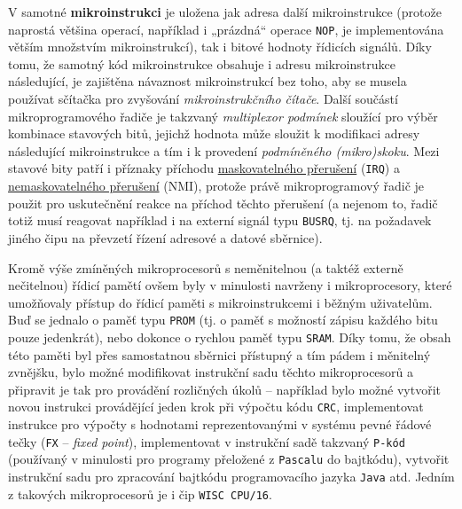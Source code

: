       V samotné \textbf{mikroinstrukci} je uložena jak adresa další mikroinstrukce (protože 
      naprostá většina operací, například i „prázdná“ operace \texttt{NOP}, je implementována 
      větším množstvím mikroinstrukcí), tak i bitové hodnoty řídicích signálů. Díky tomu, že 
      samotný kód mikroinstrukce obsahuje i adresu mikroinstrukce následující, je zajištěna 
      návaznost mikroinstrukcí bez toho, aby se musela používat sčítačka pro zvyšování 
      \emph{mikroinstrukčního čítače}. Další součástí mikroprogramového řadiče je takzvaný 
      \emph{multiplexor podmínek} sloužící pro výběr kombinace stavových bitů, jejichž hodnota může 
      sloužit k modifikaci adresy následující mikroinstrukce a tím i k provedení \emph{podmíněného 
      (mikro)skoku}. Mezi stavové bity patří i příznaky příchodu 
      \hyperlink{ces:IchapIVsecIV}{maskovatelného přerušení} (\texttt{IRQ}) a 
      \hyperlink{ces:IchapIVsecIV}{nemaskovatelného přerušení} (NMI), protože právě mikroprogramový 
      řadič je použit pro uskutečnění reakce na příchod těchto přerušení (a nejenom to, řadič totiž 
      musí reagovat například i na externí signál typu \texttt{BUSRQ}, tj. na požadavek jiného čipu 
      na převzetí řízení adresové a datové sběrnice). 
      
      \begin{note}
        Kromě výše zmíněných mikroprocesorů s neměnitelnou (a taktéž externě nečitelnou) řídicí 
        pamětí ovšem byly v minulosti navrženy i mikroprocesory, které umožňovaly přístup do řídicí 
        paměti s mikroinstrukcemi i běžným uživatelům. Buď se jednalo o paměť typu \texttt{PROM} 
        (tj. o paměť s možností zápisu každého bitu pouze jedenkrát), nebo dokonce o rychlou paměť 
        typu \texttt{SRAM}. Díky tomu, že obsah této paměti byl přes samostatnou sběrnici přístupný 
        a tím pádem i měnitelný zvnějšku, bylo možné modifikovat instrukční sadu těchto 
        mikroprocesorů a připravit je tak pro provádění rozličných úkolů – například bylo možné 
        vytvořit novou instrukci provádějící jeden krok při výpočtu kódu \texttt{CRC}, 
        implementovat instrukce pro výpočty s hodnotami reprezentovanými v systému pevné řádové 
        tečky (\texttt{FX} – \emph{fixed point}), implementovat v instrukční sadě takzvaný 
        \texttt{P-kód} (používaný v minulosti pro programy přeložené z \texttt{Pascalu} do 
        bajtkódu), vytvořit instrukční sadu pro zpracování bajtkódu programovacího jazyka 
        \texttt{Java} atd. Jedním z takových mikroprocesorů je i čip \texttt{WISC CPU/16}.
      \end{note}
           
